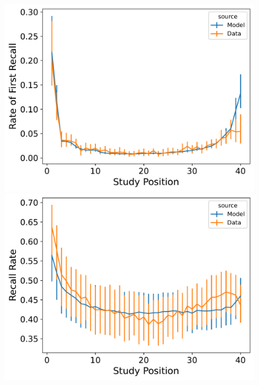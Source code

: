 \documentclass[
  letterpaper,
  11pt,
  english,
  singlespacing,
  headsepline]{MastersDoctoralThesis}
\begin{document}
\begin{figure}
\begin{minipage}{0.33\linewidth}
\includegraphics{icmr_figures/LohnasKahana2014_InstanceCMR_Model_Fitting_pfr-1.png}\end{minipage}%
%
\begin{minipage}{0.33\linewidth}
\includegraphics{icmr_figures/LohnasKahana2014_InstanceCMR_Model_Fitting_spc-1.png}\end{minipage}%
\newline
\begin{minipage}{0.33\linewidth}

\end{minipage}
\end{figure}
\end{document}
